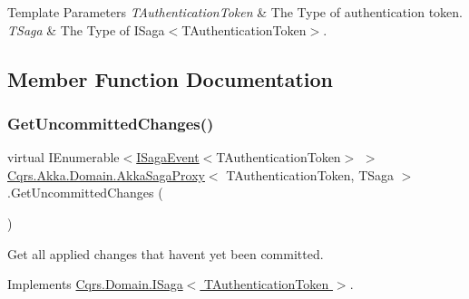 \begin{DoxyTemplParams}{Template Parameters}
{\em T\+Authentication\+Token} & The Type of authentication token.\\
\hline
{\em T\+Saga} & The Type of I\+Saga$<$\+T\+Authentication\+Token$>$.\\
\hline
\end{DoxyTemplParams}


\subsection{Member Function Documentation}
\mbox{\label{classCqrs_1_1Akka_1_1Domain_1_1AkkaSagaProxy_a8cad3415bc5474a01bfdb2db3a852ea5_a8cad3415bc5474a01bfdb2db3a852ea5}} 
\subsubsection{\texorpdfstring{Get\+Uncommitted\+Changes()}{GetUncommittedChanges()}}
{\footnotesize\ttfamily virtual I\+Enumerable$<$\hyperlink{interfaceCqrs_1_1Events_1_1ISagaEvent}{I\+Saga\+Event}$<$T\+Authentication\+Token$>$ $>$ \hyperlink{classCqrs_1_1Akka_1_1Domain_1_1AkkaSagaProxy}{Cqrs.\+Akka.\+Domain.\+Akka\+Saga\+Proxy}$<$ T\+Authentication\+Token, T\+Saga $>$.Get\+Uncommitted\+Changes (\begin{DoxyParamCaption}{ }\end{DoxyParamCaption})\hspace{0.3cm}{\ttfamily [virtual]}}



Get all applied changes that haven\textquotesingle{}t yet been committed. 



Implements \hyperlink{interfaceCqrs_1_1Domain_1_1ISaga_abb77811b4f7d19adb61f9d33da18e7e0_abb77811b4f7d19adb61f9d33da18e7e0}{Cqrs.\+Domain.\+I\+Saga$<$ T\+Authentication\+Token $>$}.

\mbox{\label{classCqrs_1_1Akka_1_1Domain_1_1AkkaSagaProxy_a21b69799b046c1fcdf5b2443699dee0c_a21b69799b046c1fcdf5b2443699dee0c}} 
